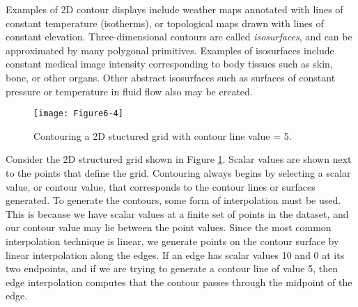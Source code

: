 Examples of 2D contour displays include weather maps annotated with lines of constant temperature (isotherms), or topological maps drawn with lines of constant elevation. Three-dimensional contours are called \emph{isosurfaces}, and can be approximated by many polygonal primitives. Examples of isosurfaces include constant medical image intensity corresponding to body tissues such as skin, bone, or other organs. Other abstract isosurfaces such as surfaces of constant pressure or temperature in fluid flow also may be created.


\begin{figure}[!htb]
	\centering
	\texttt{[image: Figure6-4]}
	\caption{ Contouring a 2D stuctured grid with contour line value = 5.}
	\label{fig:Figure6-4}
\end{figure}

Consider the 2D structured grid shown in Figure \ref{fig:Figure6-4}. Scalar values are shown next to the points that define the grid. Contouring always begins by selecting a scalar value, or contour value, that corresponds to the contour lines or surfaces generated. To generate the contours, some form of interpolation must be used. This is because we have scalar values at a finite set of points in the dataset, and our contour value may lie between the point values. Since the most common interpolation technique is linear, we generate points on the contour surface by linear interpolation along the edges. If an edge has scalar values 10 and 0 at its two endpoints, and if we are trying to generate a contour line of value 5, then edge interpolation computes that the contour passes through the midpoint of the edge.

